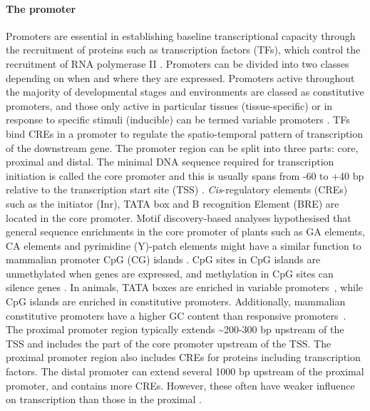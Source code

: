 \documentclass[../main.tex]{subfiles}
\begin{document}
\paragraph{The promoter}\label{chapter1:the-promoter}
Promoters are essential in establishing baseline transcriptional capacity through the recruitment of proteins such as transcription factors (TFs), which control the recruitment of RNA polymerase II \autocite{portoPlantPromotersApproach2014}.
Promoters can be divided into two classes depending on when and where they are expressed.
Promoters active throughout the majority of developmental stages and environments are classed as constitutive promoters, and those only active in particular tissues (tissue\hyp{}specific) or in response to specific stimuli (inducible) can be termed variable promoters \autocite{bilasCisregulatoryElementsUsed2016}.
TFs bind CREs in a promoter to regulate the spatio\hyp{}temporal pattern of transcription of the downstream gene.
The promoter region can be split into three parts: core, proximal and distal.
The minimal DNA sequence required for transcription initiation is called the core promoter and this is usually spans from -60 to +40 bp relative to the transcription start site (TSS) \autocite{solovyevIdentificationPromoterRegions2010,royCorePromotersTranscription2015}.
\textit{Cis}\hyp{}regulatory elements (CREs) such as the initiator (Inr), TATA box and B recognition Element (BRE) are located in the core promoter.
Motif discovery\hyp{}based analyses hypothesised that general sequence enrichments in the core promoter of plants such as GA elements, CA elements and pyrimidine (Y)\hyp{}patch elements might have a similar function to mammalian promoter CpG (CG) islands \autocite{yamamotoCharacteristicsCorePromoter2011,yamamotoHeterogeneityArabidopsisCore2009}.
CpG sites in CpG islands are unmethylated when genes are expressed, and methylation in CpG sites can silence genes \autocite{birdDNAMethylationPatterns2002}.
In animals, TATA boxes are enriched in variable promoters~\autocite{engstromGenomicRegulatoryBlocks2007,carninciGenomewideAnalysisMammalian2006}, while CpG islands are enriched in constitutive promoters.
Additionally, mammalian constitutive promoters have a higher GC content than responsive promoters~\autocite{vinogradovDNAHelixImportance2017, weiCharacterizationGenePromoters2019}.
The proximal promoter region typically extends \textasciitilde200\hyp{}300 bp upstream of the TSS and includes the part of the core promoter upstream of the TSS.
The proximal promoter region also includes CREs for proteins including transcription factors.
The distal promoter can extend several 1000 bp upstream of the proximal promoter, and contains more CREs.
However, these often have weaker influence on transcription than those in the proximal \autocite{pandiarajanVivoPromoterEngineering2018}.
\end{document}
